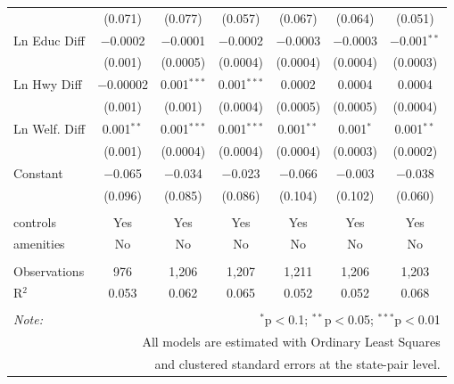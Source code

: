 \begin{table}[!htbp]
\begin{tabular}{@{\extracolsep{5pt}}lcccccc}
  & (0.071) & (0.077) & (0.057) & (0.067) & (0.064) & (0.051) \\ 
  Ln Educ Diff & $-$0.0002 & $-$0.0001 & $-$0.0002 & $-$0.0003 & $-$0.0003 & $-$0.001$^{**}$ \\ 
  & (0.001) & (0.0005) & (0.0004) & (0.0004) & (0.0004) & (0.0003) \\ 
  Ln Hwy Diff & $-$0.00002 & 0.001$^{***}$ & 0.001$^{***}$ & 0.0002 & 0.0004 & 0.0004 \\ 
  & (0.001) & (0.001) & (0.0004) & (0.0005) & (0.0005) & (0.0004) \\ 
  Ln Welf. Diff & 0.001$^{**}$ & 0.001$^{***}$ & 0.001$^{***}$ & 0.001$^{**}$ & 0.001$^{*}$ & 0.001$^{**}$ \\ 
  & (0.001) & (0.0004) & (0.0004) & (0.0004) & (0.0003) & (0.0002) \\ 
  Constant & $-$0.065 & $-$0.034 & $-$0.023 & $-$0.066 & $-$0.003 & $-$0.038 \\ 
  & (0.096) & (0.085) & (0.086) & (0.104) & (0.102) & (0.060) \\ 
 \hline \\[-1.8ex] 
controls & Yes & Yes & Yes & Yes & Yes & Yes \\ 
amenities & No & No & No & No & No & No \\ 
\hline \\[-1.8ex] 
Observations & 976 & 1,206 & 1,207 & 1,211 & 1,206 & 1,203 \\ 
R$^{2}$ & 0.053 & 0.062 & 0.065 & 0.052 & 0.052 & 0.068 \\ 
\hline 
\hline \\[-1.8ex] 
\textit{Note:}  & \multicolumn{6}{r}{$^{*}$p$<$0.1; $^{**}$p$<$0.05; $^{***}$p$<$0.01} \\ 
 & \multicolumn{6}{r}{All models are estimated with Ordinary Least Squares} \\ 
 & \multicolumn{6}{r}{and clustered standard errors at the state-pair level.} \\ 
\end{tabular} 
\end{table} 
